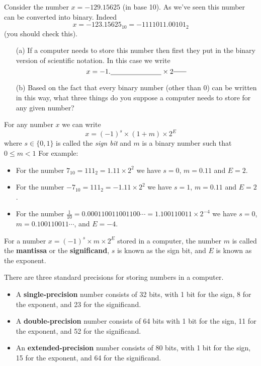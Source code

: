 \begin{problem}
    Consider the number $x = -129.15625$ (in base 10).  As we've seen this number can be
    converted into binary.  Indeed
    \[ x = -123.15625_{10} = -1111011.00101_2 \]
    (you should check this).  
    \begin{enumerate}
        \item[(a)] If a computer needs to store this number then first they put in the
            binary version of scientific notation.  In this case we write 
            \[ x = -1. \underline{\hspace{1in}} \times 2^{\underline{\hspace{0.25in}}} \]
            \solution{
                \[ -1.11101100101 \times 2^{6} \]
                }
        \item[(b)] Based on the fact that every binary number (other than 0) can be
            written in this way, what three things do you suppose a computer needs to
            store for any given number? 
    \end{enumerate}
\end{problem}

For any number $x$ we can write
\[ x = (-1)^{s} \times (1+ m) \times 2^E \]
where $s \in \{0,1\}$ is called the {\it sign bit} and $m$ is a binary number such that $0
\le m < 1$
For example: 
\begin{itemize}
\item For the number $7_{10}=111_2 = 1.11 \times 2^2$ we have $s=0$, $m=0.11$ and $E=2$.
\item For the number $-7_{10}=111_2 = -1.11 \times 2^2$ we have $s=1$, $m=0.11$ and $E=2$.
\item For the number $\frac{1}{10} = 0.000110011001100\cdots = 1.100110011 \times 2^{-4}$
    we have $s=0$, $m=0.100110011\cdots$, and $E = -4$.
\end{itemize}


\begin{definition}
    For a number $x = (-1)^{s} \times m \times 2^E$ stored in a computer, the number $m$
    is called the {\bf mantissa} or the {\bf significand}, $s$ is known as the sign bit,
    and $E$ is known as the exponent.
\end{definition}

\begin{definition}
    There are three standard precisions for storing numbers in a computer.
    \begin{itemize}
        \item A {\bf single-precision} number consists of 32 bits, with 1 bit for the
            sign, 8 for the exponent, and 23 for the significand.
        \item A {\bf double-precision} number consists of 64 bits with 1 bit for the sign,
            11 for the exponent, and 52 for the significand.
        \item An {\bf extended-precision} number consists of 80 bits, with 1 bit for the
            sign, 15 for the exponent, and 64 for the significand.
    \end{itemize}
\end{definition}

